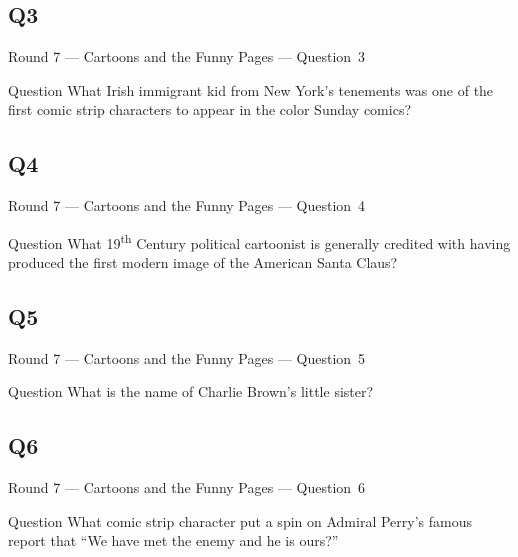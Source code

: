 \documentclass[11pt]{beamer}
\begin{document}
\subsection*{Q3}
\begin{frame}[t]{Round 7 --- Cartoons and the Funny Pages --- \mbox{Question 3}}
    \vspace{-0.5em}
    \begin{block}{Question}
        What Irish immigrant kid from New York's tenements was one of the first comic strip characters to appear in the color Sunday comics?
    \end{block}
\end{frame}
\subsection*{Q4}
\begin{frame}[t]{Round 7 --- Cartoons and the Funny Pages --- \mbox{Question 4}}
    \vspace{-0.5em}
    \begin{block}{Question}
        What 19\textsuperscript{th} Century  political cartoonist is generally credited with having produced the first modern image of the American Santa Claus?
    \end{block}
\end{frame}
\subsection*{Q5}
\begin{frame}[t]{Round 7 --- Cartoons and the Funny Pages --- \mbox{Question 5}}
    \vspace{-0.5em}
    \begin{block}{Question}
        What is the name of Charlie Brown's little sister?
    \end{block}
\end{frame}
\subsection*{Q6}
\begin{frame}[t]{Round 7 --- Cartoons and the Funny Pages --- \mbox{Question 6}}
    \vspace{-0.5em}
    \begin{block}{Question}
        What comic strip character put a spin on Admiral Perry's famous report that ``We have met the enemy and he is ours?''
    \end{block}
\end{frame}
\end{document}
